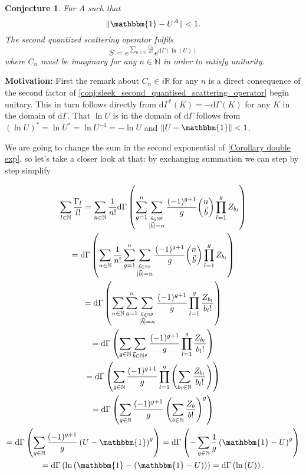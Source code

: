 \documentclass[b5paper,draft,openbib,12pt]{memoir}
\newtheorem{Conj}[Def]{Conjecture}
\newcommand{\id}{\mathbbm{1}}
\begin{document}
\begin{Conj}
For \(A\) such that 
\begin{equation}
\|\id-U^A\|<1.
\end{equation}
The second quantized scattering operator fulfils
\begin{equation}\label{conj:sleek_second_quantised_scattering_operator}
S= e^{\sum_{n\in\mathbb{N}} \frac{C_n}{n!}} e^{\mathrm{d}\Gamma(\ln (U))}
\end{equation}
where \(C_n\) must be imaginary for any \(n\in\mathbb{N}\) in order to satisfy unitarity.

\end{Conj}
\textbf{Motivation:} 
First the remark about \(C_n \in i \mathbb{R}\) for any \(n\) is a direct consequence of 
the second factor of \eqref{conj:sleek_second_quantised_scattering_operator} begin unitary.
This in turn follows directly from \(\mathrm{d}\Gamma^* (K)=-\mathrm{d}\Gamma(K)\) for any \(K\) in the domain of \(\mathrm{d}\Gamma\).
That \(\ln U\) is in the domain of \(\mathrm{d}\Gamma\) follows from \( (\ln U)^*=\ln U^*=\ln U^{-1}=-\ln U\)
and \(\|U-\id\|<1\).

 We are going to change the sum in the second exponential of 
\eqref{Corollary double exp}, so let's take a closer look at that: by exchanging summation
we can step by step simplify

\begin{multline}
\sum_{l\in\mathbb{N}} \frac{\mathrm\Gamma_{l}}{l!}= 
\sum_{n \in\mathbb{N}} \frac{1}{n!} 
\mathrm{d}\Gamma\left( \sum_{g=1}^n \sum_{\stackrel{\vec{b}\in\mathbb{N}^g}{|\vec{b}|=n}}\frac{(-1)^{g+1}}{g} 
\binom{n}{\vec{b}} \prod_{l=1}^g Z_{b_l}  \right)\\
=\mathrm{d}\Gamma\left( \sum_{n \in\mathbb{N}} \frac{1}{n!} 
 \sum_{g=1}^n \sum_{\stackrel{\vec{b}\in\mathbb{N}^g}{|\vec{b}|=n}}\frac{(-1)^{g+1}}{g} 
\binom{n}{\vec{b}} \prod_{l=1}^g Z_{b_l}  \right)\\
=\mathrm{d}\Gamma\left( \sum_{n \in\mathbb{N}}
 \sum_{g=1}^n \sum_{\stackrel{\vec{b}\in\mathbb{N}^g}{|\vec{b}|=n}}\frac{(-1)^{g+1}}{g} 
 \prod_{l=1}^g \frac{Z_{b_l}}{b_l!}  \right)\\
=\mathrm{d}\Gamma\left( 
 \sum_{g\in\mathbb{N}} \sum_{\vec{b}\in\mathbb{N}^g}\frac{(-1)^{g+1}}{g} 
\prod_{l=1}^g \frac{Z_{b_l}}{b_l!}  \right)\\
=\mathrm{d}\Gamma\left( 
 \sum_{g\in\mathbb{N}} \frac{(-1)^{g+1}}{g} 
\prod_{l=1}^g \left(\sum_{b_l\in\mathbb{N}} \frac{Z_{b_l}}{b_l!} \right) \right)\\
=\mathrm{d}\Gamma\left( 
 \sum_{g\in\mathbb{N}} \frac{(-1)^{g+1}}{g} 
 \left(\sum_{b\in\mathbb{N}} \frac{Z_{b}}{b!} \right)^g \right)\\
 =\mathrm{d}\Gamma\left( 
 \sum_{g\in\mathbb{N}} \frac{(-1)^{g+1}}{g} 
 \left(U-\id \right)^g \right)
 =\mathrm{d}\Gamma\left( -
 \sum_{g\in\mathbb{N}} \frac{1}{g} 
 \left(\id-U \right)^g \right)\\
  =\mathrm{d}\Gamma\left( 
 \ln \left(\id-\left(\id-U\right) \right) \right)
 =\mathrm{d}\Gamma\left( \ln \left(U\right)\right).
\end{multline}
\end{document}
